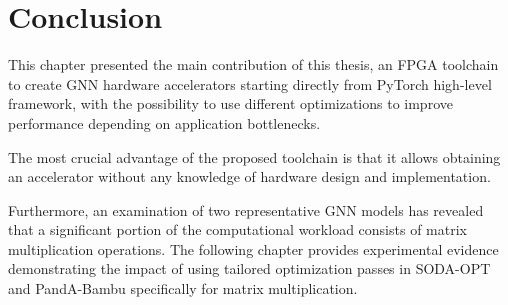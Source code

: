 \section{Conclusion}
\label{sec:toolchain-discussion}%

This chapter presented the main contribution of this thesis, an FPGA toolchain to create GNN hardware accelerators starting directly from PyTorch high-level framework, with the possibility to use different optimizations to improve performance depending on application bottlenecks.

The most crucial advantage of the proposed toolchain is that it allows obtaining an accelerator without any knowledge of hardware design and implementation.

Furthermore, an examination of two representative GNN models has revealed that a significant portion of the computational workload consists of matrix multiplication operations.
The following chapter provides experimental evidence demonstrating the impact of using tailored optimization passes in SODA-OPT and PandA-Bambu specifically for matrix multiplication.